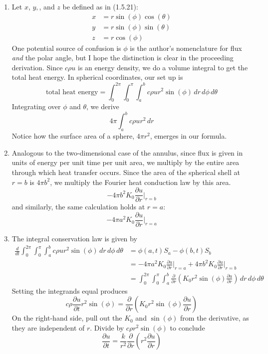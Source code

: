 \documentclass[a4paper]{article}
\begin{document}
\begin{enumerate}[label=(\alph*)]
	\item Let \( x \), \( y, \), and \( z \) be defined as in (1.5.21):
	\begin{align*}
		x & = r \sin\!\left(\phi\right)\cos\!\left(\theta\right) \\
		y & = r \sin\!\left(\phi\right)\sin\!\left(\theta\right) \\ 
		z & = r \cos\!\left(\phi\right)
	\end{align*}
	One potential source of confusion is \( \phi \) is the author's nomenclature for flux \textit{and} the polar angle, but I hope the distinction is clear in the proceeding derivation. Since \( c \rho u \) is an energy density, we do a volume integral to get the total heat energy. In spherical coordinates, our set up is
	\[	
		\text{total heat energy} = \int^{2 \pi}_{0} \int^{\pi}_{0} \int^{b}_{a} c \rho u r^{2}\sin\!\left(\phi\right) \, dr \, d \phi \, d \theta  
	\]
	Integrating over \( \phi \) and \( \theta \), we derive
	\[
		4 \pi \int^{b}_{a} c \rho u r^{2} \, dr  
	\]
	Notice how the surface area of a sphere, \( 4 \pi r^{2} \), emerges in our formula.
	\item Analogous to the two-dimensional case of the annulus, since flux is given in units of energy per unit time per unit area, we multiply by the entire area through which heat transfer occurs. Since the area of the spherical shell at \( r = b \) is \( 4 \pi b^{2} \), we multiply the Fourier heat conduction law by this area.
	\[
		-4 \pi b^{2}K_{0}\frac{\partial u}{\partial r}\Big|_{r=b} 
	\]
	and similarly, the same calculation holds at \( r = a \):
	\[
		-4 \pi a^{2}K_{0}\frac{\partial u}{\partial r}\Big|_{r=a} 
	\]
	\item The integral conservation law is given by
	\begin{align*}
		\frac{d }{dt}\int^{2 \pi}_{0} \int^{\pi}_{0} \int^{b}_{a} c \rho u r^{2}\sin\!\left(\phi\right) \, dr \, d \phi \, d \theta & = \phi \!\left( a,t \right) S_{a} - \phi \!\left( b,t \right) S_{b} \\
															       & = -4 \pi a^{2}K_{0}\frac{\partial u}{\partial r}\Big|_{r=a} + 4 \pi b^{2}K_{0}\frac{\partial u}{\partial r}\Big|_{r=b} \\
															       & = \int^{2 \pi}_{0} \int^{\pi}_{0} \int^{b}_{a} \frac{\partial }{\partial r}\!\left( K_{0}r^{2}\sin\!\left(\phi\right)\frac{\partial u}{\partial r} \right) \, dr \, d \phi \, d \theta 
	\end{align*}
	Setting the integrands equal produces
	\[
		c \rho \frac{\partial u}{\partial t}r^{2}\sin\!\left(\phi\right) = \frac{\partial }{\partial r}\!\left( K_{0}r^{2}\sin\!\left(\phi\right) \frac{\partial u}{\partial r} \right)
	\]
	On the right-hand side, pull out the \( K_{0} \) and \( \sin\!\left(\phi\right) \) from the derivative, as they are independent of \( r \). Divide by \( c \rho r^{2} \sin\!\left(\phi\right) \) to conclude
	\[
		\frac{\partial u}{\partial t} = \frac{k}{r^{2}}\frac{\partial }{\partial r}\!\left( r^{2}\frac{\partial u}{\partial r} \right) 
	\]
\end{enumerate}	
\end{document}
